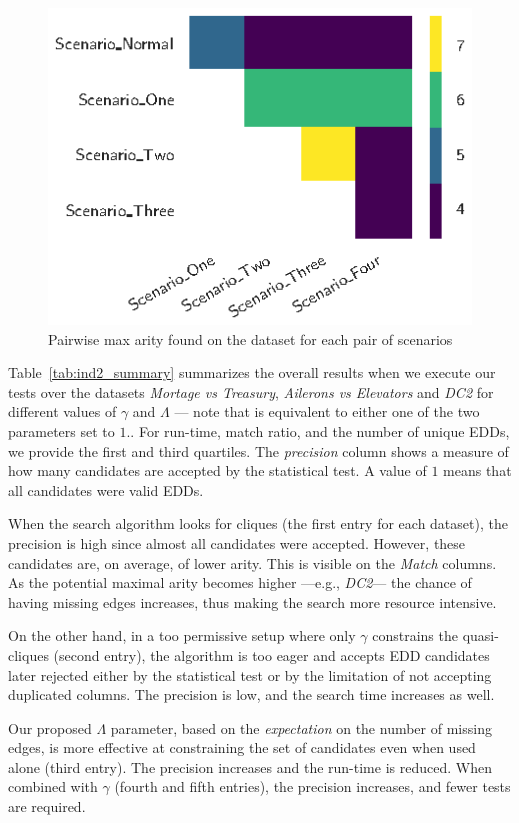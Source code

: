 \begin{figure}[ht]
    \centering
    \includegraphics[width=0.5\linewidth]{images/5_presq/afds}
    \caption{
        Pairwise max arity found on the  dataset for each pair of scenarios
    }
    \label{fig:afds}
\end{figure}

Table~\ref{tab:ind2_summary} summarizes the overall results when
we execute our tests over the datasets \emph{Mortage vs Treasury},
\emph{Ailerons vs Elevators} and \emph{DC2} for different values of $\gamma$ and $\Lambda$ ---
note that \Find is equivalent to either one of the two parameters set to $1.$. For run-time,
match ratio, and the number of unique \glspl{EDD}, we provide the first and third quartiles.
The \emph{precision} column shows a measure of how many candidates are accepted by the
statistical test. A value of $1$ means that all candidates were valid \glspl{EDD}.

When the search algorithm looks for cliques (the first entry for each dataset),
the precision is high since almost all candidates were accepted. However,
these candidates are, on average, of lower arity. This is visible on the \emph{Match}
columns. As the potential maximal arity becomes higher ---e.g., \emph{DC2}--- the
chance of having missing edges increases, thus making the search more resource intensive.

On the other hand, in a too permissive setup where only $\gamma$ constrains the quasi-cliques
(second entry), the algorithm is too eager and accepts \gls{EDD} candidates later rejected either
by the statistical test or by the limitation of not accepting duplicated columns.
The precision is low, and the search time increases as well.

Our proposed $\Lambda$ parameter, based on the \emph{expectation} on the number of missing edges,
is more effective at constraining the set of candidates even when used alone (third entry).
The precision increases and the run-time is reduced.
When combined with $\gamma$ (fourth and fifth entries), the precision increases, and fewer
tests are required.

